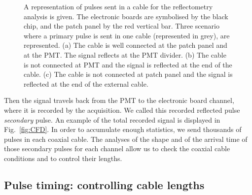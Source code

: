 \begin{figure}
\begin{subfigure}[b]{0.3\textwidth}
     \end{subfigure}
     \caption{A representation of pulses sent in a cable for the reflectometry analysis is given.
       The electronic boards are symbolised by the black chip, and the patch panel by the red vertical bar.
       Three scenario where a primary pulse is sent in one cable (represented in grey), are represented.
     (a) The cable is well connected at the patch panel and at the PMT. The signal reflects at the PMT divider.
     (b) The cable is not connected at PMT and the signal is reflected at the end of the cable.
     (c) The cable is not connected at patch panel and the signal is reflected at the end of the external cable.}
        \label{fig:three graphs}
\end{figure}
Then the signal travels back from the PMT to the electronic board channel, where it is recorded by the acquisition.
We called this recorded reflected pulse \emph{secondary} pulse.
An example of the total recorded signal is displayed in Fig.~\ref{fig:CFD}.
In order to accumulate enough statistics, we send thousands of pulses in each coaxial cable.
The analyses of the shape and of the arrival time of those secondary pulses for each channel allow us to check the coaxial cable conditions and to control their lengths.

\subsection{Pulse timing: controlling cable lengths}
\label{subsec:timing}

